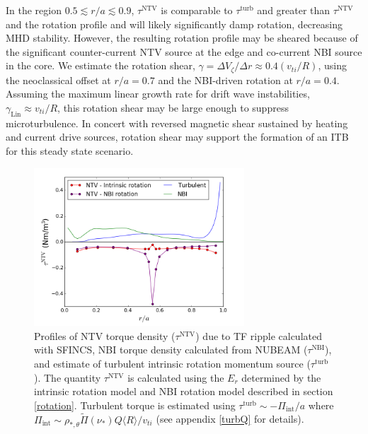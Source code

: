 \documentclass[aip, pop, preprint]{revtex4-1}
\numberwithin{figure}{section}
\numberwithin{equation}{section}
\begin{document}
In the region $0.5 \lesssim r/a \lesssim 0.9$, $\tau^{\text{NTV}}$ is comparable to $\tau^{\text{turb}}$ and greater than $\tau^{\text{NTV}}$ and the rotation profile and will likely significantly damp rotation, decreasing MHD stability. However, the resulting rotation profile may be sheared because of the significant counter-current NTV source at the edge and co-current NBI source in the core. We estimate the rotation shear, $\gamma = \Delta V_{\zeta}/ \Delta r \approx 0.4 (v_{ti}/R)$, using the neoclassical offset at $r/a = 0.7$ and the NBI-driven rotation at $r/a = 0.4$. Assuming the maximum linear growth rate for drift wave instabilities, $\gamma_{\text{Lin}} \approx v_{ti}/R$,\cite{Connor2004} this rotation shear may be large enough to suppress microturbulence. In concert with reversed magnetic shear sustained by heating and current drive sources,\cite{Poli2014} rotation shear may support the formation of an ITB\cite{Waltz1994} for this steady state scenario. 
\begin{figure}[h!]
\centering
\includegraphics[width=0.7\textwidth]{AllTorquePlot.png}
\caption{\label{fig:alltorque} Profiles of NTV torque density ($\tau^{\text{NTV}}$) due to TF ripple calculated with SFINCS, NBI torque density calculated from NUBEAM ($\tau^{\text{NBI}}$), and estimate of turbulent intrinsic rotation momentum source ($\tau^{\text{turb}}$). The quantity $\tau^{\text{NTV}}$ is calculated using the $E_r$ determined by the intrinsic rotation model and NBI rotation model described in section \ref{rotation}. Turbulent torque is estimated using $\tau^{\text{turb}} \sim -\Pi_{\text{int}}/a$ where $\Pi_{\text{int}} \sim \rho_{*, \theta} \widetilde{\Pi}(\nu_*) Q \langle R \rangle/v_{ti}$ (see appendix \ref{turbQ} for details).}
\end{figure}

\FloatBarrier
\end{document}
